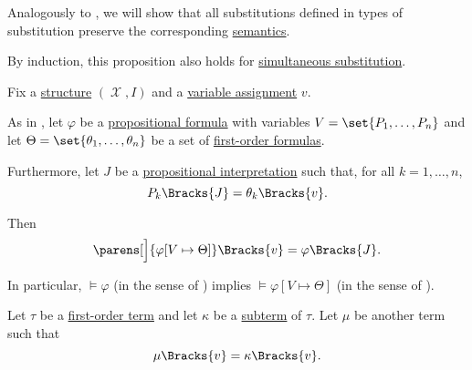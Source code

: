 \begin{proposition}\label{thm:first_order_substitution_equivalence}
  Analogously to , we will show that all substitutions defined in  types of substitution preserve the corresponding \hyperref[def:first_order_semantics]{semantics}.

  By induction\IND, this proposition also holds for \hyperref[def:propositional_substitution/simultaneous]{simultaneous substitution}.

  Fix a \hyperref[def:first_order_structure]{structure} \( (\mscrX, I) \) and a \hyperref[def:first_order_valuation/variable_assignment]{variable assignment} \( v \).

  \begin{thmenum}
     As in , let \( \varphi \) be a \hyperref[def:propositional_syntax/formula]{propositional formula} with variables \( {V = \set{ P_1, \ldots, P_n }} \) and let \( \Theta = \set{ \theta_1, \ldots, \theta_n } \) be a set of \hyperref[def:first_order_syntax/formula]{first-order formulas}.

    Furthermore, let \( J \) be a \hyperref[def:propositional_valuation/interpretation]{propositional interpretation} such that, for all \( k = 1, \ldots, n \),
    \begin{equation}\label{eq:thm:first_order_substitution_equivalence/propositional/compatibility}
      P_k\Bracks{J} = \theta_k\Bracks{v}.
    \end{equation}

    Then
    \begin{equation}\label{eq:thm:first_order_substitution_equivalence/propositional}
      \parens[\Big]{ \varphi[V \mapsto \Theta] }\Bracks{v} = \varphi \Bracks{J}.
    \end{equation}

    In particular, \( \vDash \varphi \) (in the sense of ) implies \( \vDash \varphi[V \mapsto \Theta] \) (in the sense of ).

     Let \( \tau \) be a \hyperref[def:first_order_syntax/term]{first-order term} and let \( \kappa \) be a \hyperref[def:first_order_syntax/subterm]{subterm} of \( \tau \). Let \( \mu \) be another term such that
    \begin{equation}\label{eq:thm:first_order_substitution_equivalence/term_in_term/compatibility}
      \mu\Bracks{v} = \kappa\Bracks{v}.
    \end{equation}


\end{thmenum}
\end{proposition}
